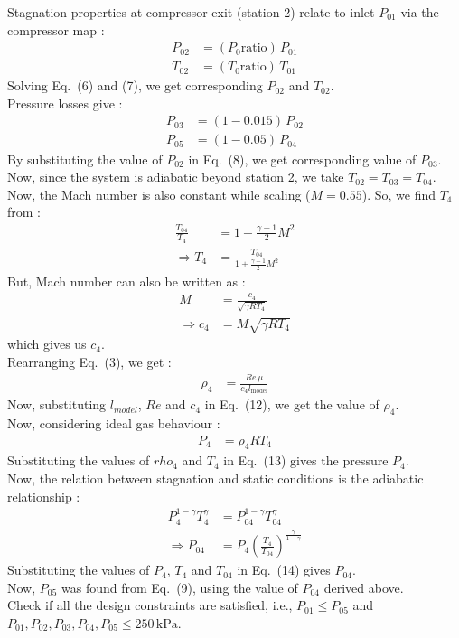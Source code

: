 \documentclass[12pt,a4paper]{article}
\begin{document}
Stagnation properties at compressor exit (station 2) relate to inlet $P_{01}$ via the compressor map :
\begin{align}
  P_{02} &= (P_0\mathrm{ratio})\,P_{01}\\
  T_{02} &= (T_0\mathrm{ratio})\,T_{01}
\end{align}
Solving Eq.~(6) and (7), we get corresponding $P_{02}$ and $T_{02}$.\\
Pressure losses give :
\begin{align}
  P_{03} &= (1-0.015)\,P_{02}\\
  P_{05} &= (1-0.05)\,P_{04}
\end{align}
By substituting the value of $P_{02}$ in Eq.~(8), we get corresponding value of $P_{03}$.\\
Now, since the system is adiabatic beyond station 2, we take $T_{02} = T_{03} = T_{04}$.\\
Now, the Mach number is also constant while scaling ($M = 0.55$). So, we find $T_{4}$ from :
\begin{align}
\frac{T_{04}}{T_4} &= 1 + \frac{\gamma - 1}{2} M^2 \nonumber \\
\Rightarrow T_4 &= \frac{T_{04}}{1 + \frac{\gamma - 1}{2} M^2}
\end{align}
But, Mach number can also be written as :
\begin{align}
M &= \frac{c_4}{\sqrt{\gamma R T_4}} \nonumber \\
\Rightarrow c_4 &= M \sqrt{\gamma R T_4}
\end{align}
which gives us $c_{4}$.\\
Rearranging Eq.~(3), we get :
\begin{align}
  \rho_4 &= \frac{Re\, \mu}{c_4 l_{\mathrm{model}}}
\end{align}
Now, substituting $l_{model}$, $Re$ and $c_{4}$ in Eq.~(12), we get the value of $\rho_{4}$.\\
Now, considering ideal gas behaviour :
\begin{align}
  P_4 &= \rho_4 R T_4
\end{align}
Substituting the values of $rho_{4}$ and $T_{4}$ in Eq.~(13) gives the pressure $P_{4}$.\\
Now, the relation between stagnation and static conditions is the adiabatic relationship :
\begin{align}
P_4^{1-\gamma}T_4^\gamma &= P_{04}^{1-\gamma}T_{04}^\gamma \nonumber \\
\Rightarrow P_{04} &= P_4 \left(\frac{T_4}{T_{04}}\right)^{\frac{\gamma}{1-\gamma}}
\end{align}
Substituting the values of $P_{4}$, $T_{4}$ and $T_{04}$ in Eq.~(14) gives $P_{04}$.\\
Now, $P_{05}$ was found from Eq.~(9), using the value of $P_{04}$ derived above.\\
Check if all the design constraints are satisfied, i.e., $P_{01} \leq P_{05}$ and $P_{01}, P_{02}, P_{03}, P_{04}, P_{05} \leq 250\,\mathrm{kPa}$.\\
\end{document}
